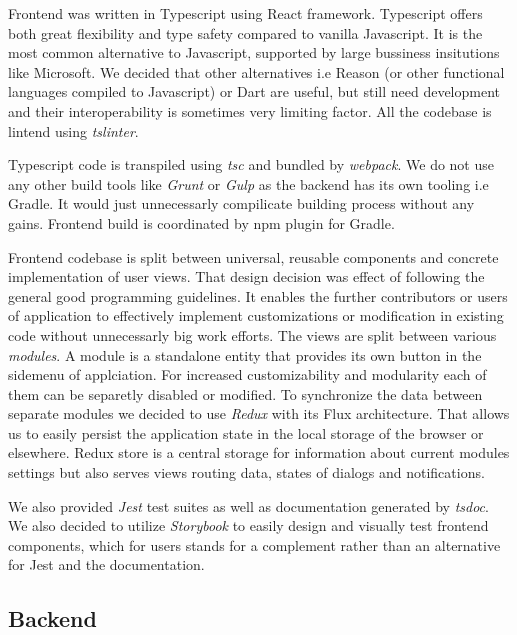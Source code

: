 \documentclass[licencjacka,en]{thesisclass}
\begin{document}
    Frontend was written in Typescript \cite{Typescript} using React \cite{React} framework.
    Typescript offers both great flexibility and type safety compared to vanilla Javascript.
    It is the most common alternative to Javascript, supported by large bussiness insitutions like Microsoft.
    We decided that other alternatives i.e Reason (or other functional languages compiled to Javascript) or Dart are useful, but
    still need development and their interoperability is sometimes very limiting factor. All the codebase is lintend using \textit{tslinter}.
    
    Typescript code is transpiled using \textit{tsc} and bundled by \textit{webpack}. We do not use any other build tools like
    \textit{Grunt} or \textit{Gulp} as the backend has its own tooling i.e Gradle. It would just unnecessarly compilicate building process without any gains.
    Frontend build is coordinated by npm plugin for Gradle.

    Frontend codebase is split between universal, reusable components and concrete implementation of user views. That design decision was effect of following the
    general good programming guidelines. It enables the further contributors or users of application to effectively implement customizations or modification 
    in existing code without unnecessarly big work efforts. The views are split between various \textit{modules}. A module is a standalone entity that provides its 
    own button in the sidemenu of applciation. For increased customizability and modularity each of them can be separetly disabled or modified.
    To synchronize the data between separate modules we decided to use \textit{Redux} with its Flux architecture. That allows us to easily persist the application state
    in the local storage of the browser or elsewhere. Redux store is a central storage for information about current modules settings but also serves views routing data,
    states of dialogs and notifications.
    
    We also provided \textit{Jest} test suites as well as documentation generated by \textit{tsdoc}.
    We also decided to utilize \textit{Storybook} to easily design and visually test frontend components, which for users stands for a complement rather than an alternative for Jest and the documentation.
    
    \subsection{Backend}
\end{document}
